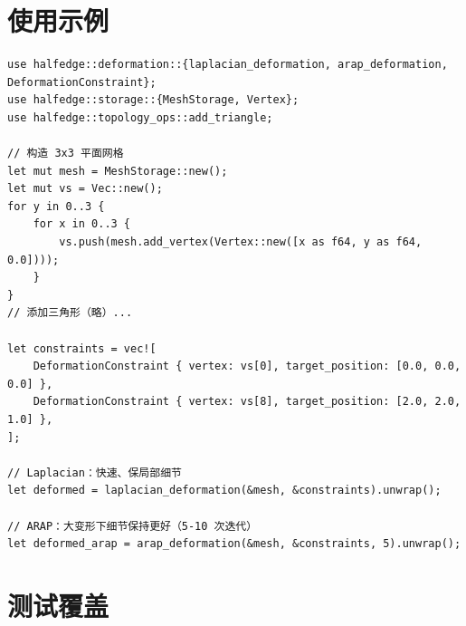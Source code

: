 \documentclass[11pt,a4paper]{article}
\begin{document}
\section{使用示例}

\begin{lstlisting}
use halfedge::deformation::{laplacian_deformation, arap_deformation, DeformationConstraint};
use halfedge::storage::{MeshStorage, Vertex};
use halfedge::topology_ops::add_triangle;

// 构造 3x3 平面网格
let mut mesh = MeshStorage::new();
let mut vs = Vec::new();
for y in 0..3 {
    for x in 0..3 {
        vs.push(mesh.add_vertex(Vertex::new([x as f64, y as f64, 0.0])));
    }
}
// 添加三角形（略）...

let constraints = vec![
    DeformationConstraint { vertex: vs[0], target_position: [0.0, 0.0, 0.0] },
    DeformationConstraint { vertex: vs[8], target_position: [2.0, 2.0, 1.0] },
];

// Laplacian：快速、保局部细节
let deformed = laplacian_deformation(&mesh, &constraints).unwrap();

// ARAP：大变形下细节保持更好（5-10 次迭代）
let deformed_arap = arap_deformation(&mesh, &constraints, 5).unwrap();
\end{lstlisting}

\section{测试覆盖}
\end{document}
